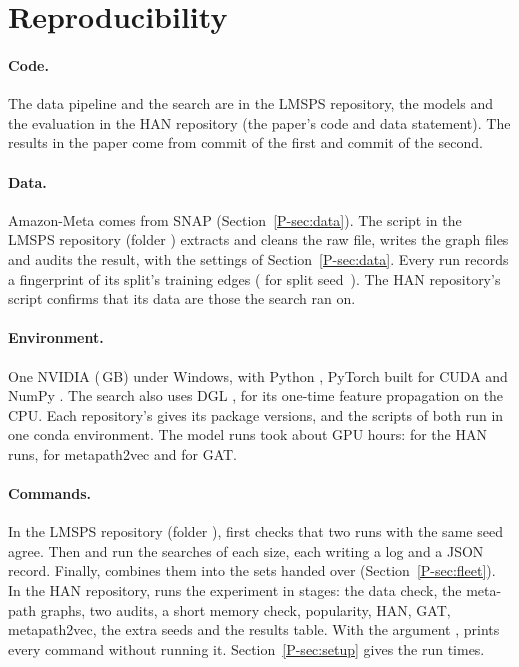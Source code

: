 


\section{Reproducibility}
\label{app:repro}

\paragraph{Code.} The data pipeline and the search are in the LMSPS repository, the models and the
evaluation in the HAN repository (the paper's code and data statement). The results in the paper
come from commit \texttt{} of the first and commit
\texttt{} of the second.

\paragraph{Data.} Amazon-Meta comes from SNAP (Section~\ref*{P-sec:data}). The script
 in the LMSPS repository (folder ) extracts and cleans the raw
file, writes the graph files and audits the result, with the settings of Section~\ref*{P-sec:data}.
Every run records a fingerprint of its split's training edges (\texttt{} for
split seed~). The HAN repository's script  confirms that its
data are those the search ran on.

\paragraph{Environment.} One NVIDIA  (\,GB) under Windows, with
Python , PyTorch  built for CUDA  and NumPy
. The search also uses DGL , for its one-time feature propagation on the
CPU. Each repository's  gives its package versions, and the scripts of both
run in one conda environment. The model runs took about  GPU hours:
 for the  HAN runs,  for metapath2vec and
 for GAT.

\paragraph{Commands.} In the LMSPS repository (folder ), 
first checks that two runs with the same seed agree. Then  and
 run the  searches of each size, each writing a log and a JSON
record. Finally,  combines them into the sets handed over
(Section~\ref*{P-sec:fleet}). In the HAN repository,  runs the experiment in stages:
the data check, the meta-path graphs, two audits, a short memory check, popularity, HAN, GAT,
metapath2vec, the extra seeds and the results table. With the argument ,  prints
every command without running it. Section~\ref*{P-sec:setup} gives the run times.

